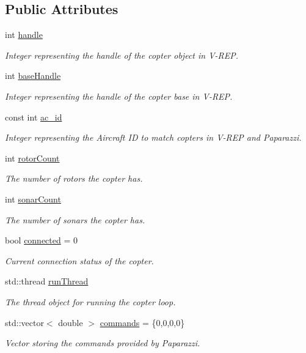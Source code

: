\subsection*{Public Attributes}
\begin{DoxyCompactItemize}
\item 
int \hyperlink{classFinken_a96990553bc26c8bf26effe8edd6e6369}{handle}
\begin{DoxyCompactList}\small\item\em Integer representing the handle of the copter object in V-\/\+R\+EP. \end{DoxyCompactList}\item 
int \hyperlink{classFinken_aef4736605ea21831e5340f66a931f8ac}{base\+Handle}
\begin{DoxyCompactList}\small\item\em Integer representing the handle of the copter base in V-\/\+R\+EP. \end{DoxyCompactList}\item 
const int \hyperlink{classFinken_a496f5024f0876710ca1cfd55a2924e85}{ac\+\_\+id}
\begin{DoxyCompactList}\small\item\em Integer representing the Aircraft ID to match copters in V-\/\+R\+EP and Paparazzi. \end{DoxyCompactList}\item 
int \hyperlink{classFinken_a41d179b5343816aad624ae5d567892a0}{rotor\+Count}
\begin{DoxyCompactList}\small\item\em The number of rotors the copter has. \end{DoxyCompactList}\item 
int \hyperlink{classFinken_acca526b76c18d3bb890d3d8adef78cfa}{sonar\+Count}
\begin{DoxyCompactList}\small\item\em The number of sonars the copter has. \end{DoxyCompactList}\item 
bool \hyperlink{classFinken_a83131e08852cbcebaffa1eef80164a6e}{connected} = 0
\begin{DoxyCompactList}\small\item\em Current connection status of the copter. \end{DoxyCompactList}\item 
std\+::thread \hyperlink{classFinken_a490f025c596b5c87d1c583124b53e34b}{run\+Thread}
\begin{DoxyCompactList}\small\item\em The thread object for running the copter loop. \end{DoxyCompactList}\item 
std\+::vector$<$ double $>$ \hyperlink{classFinken_aa4fe546d88b52ff92990bd67ced70567}{commands} = \{0,0,0,0\}
\begin{DoxyCompactList}\small\item\em Vector storing the commands provided by Paparazzi. \end{DoxyCompactList}\end{DoxyCompactItemize}

